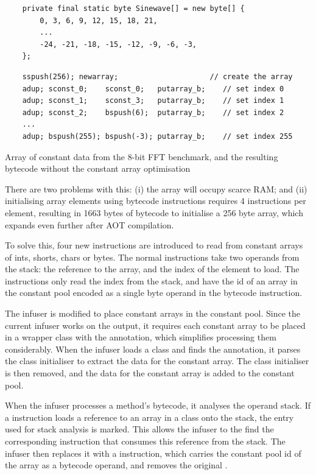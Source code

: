 \begin{listing}
\begin{verbatim}
    private final static byte Sinewave[] = new byte[] {
        0, 3, 6, 9, 12, 15, 18, 21,
        ...
        -24, -21, -18, -15, -12, -9, -6, -3, 
    };
\end{verbatim}
\begin{verbatim}
    sspush(256); newarray;                     // create the array
    adup; sconst_0;    sconst_0;   putarray_b;    // set index 0
    adup; sconst_1;    sconst_3;   putarray_b;    // set index 1
    adup; sconst_2;    bspush(6);  putarray_b;    // set index 2
    ...
    adup; bspush(255); bspush(-3); putarray_b;    // set index 255
\end{verbatim}
\caption{Array of constant data from the 8-bit FFT benchmark, and the resulting bytecode without the constant array optimisation}
\label{lst-constant-array-initialisation}
\end{listing}


There are two problems with this: (i) the array will occupy scarce RAM; and (ii) initialising array elements using bytecode instructions requires 4 instructions per element, resulting in 1663 bytes of bytecode to initialise a 256 byte array, which expands even further after AOT compilation.

To solve this, four new  instructions are introduced to read from constant arrays of ints, shorts, chars or bytes. The normal  instructions take two operands from the stack: the reference to the array, and the index of the element to load. The  instructions only read the index from the stack, and have the id of an array in the constant pool encoded as a single byte operand in the bytecode instruction.

The infuser is modified to place constant arrays in the constant pool. Since the current infuser works on the  output, it requires each constant array to be placed in a wrapper class with the  annotation, which simplifies processing them considerably. When the infuser loads a class and finds the  annotation, it parses the  class initialiser to extract the data for the constant array. The class initialiser is then removed, and the data for the constant array is added to the constant pool.

When the infuser processes a method's bytecode, it analyses the operand stack. If a  instruction loads a reference to an array in a  class onto the stack, the entry used for stack analysis is marked. This allows the infuser to the find the corresponding  instruction that consumes this reference from the stack. The infuser then replaces it with a  instruction, which carries the constant pool id of the array as a bytecode operand, and removes the original .

